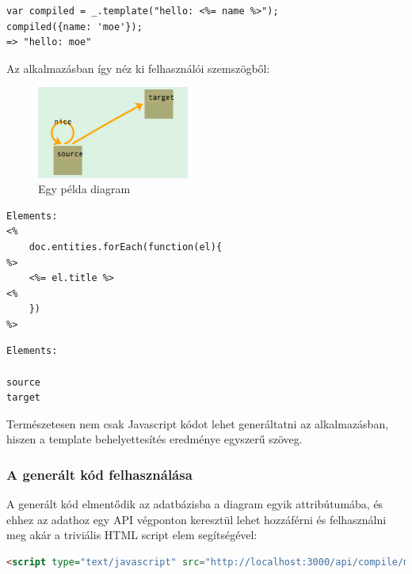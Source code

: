 \begin{lstlisting}[caption=Underscore template lefordítása]
var compiled = _.template("hello: <%= name %>");
compiled({name: 'moe'});
=> "hello: moe"
\end{lstlisting}

Az alkalmazásban így néz ki felhasználói szemszögből:

\begin{figure}[!ht]
\centering
\includegraphics[width=5cm,keepaspectratio]{figures/simple-graph.png}
\caption{Egy példa diagram}
\label{fig:compileseq}
\end{figure}

\begin{lstlisting}[caption=A gráftranszformációs Underscore template]
Elements: 
<% 
    doc.entities.forEach(function(el){
%>
    <%= el.title %>
<%
    })
%>
\end{lstlisting}


\begin{lstlisting}[language=HTML,caption=Az eredmény]
Elements: 

source
target
\end{lstlisting}

Természetesen nem csak Javascript kódot lehet generáltatni az alkalmazásban, hiszen a template behelyettesítés eredménye egyszerű szöveg. 






\subsubsection{A generált kód felhasználása}

A generált kód elmentődik az adatbázisba a diagram egyik attribútumába, és ehhez az adathoz egy API végponton keresztül lehet hozzáférni és felhasználni meg akár a triviális HTML script elem segítségével:

\begin{lstlisting}[language=HTML]
 <script type="text/javascript" src="http://localhost:3000/api/compile/modules/5242aa48ddda9b0000000001/"></script>
\end{lstlisting}

